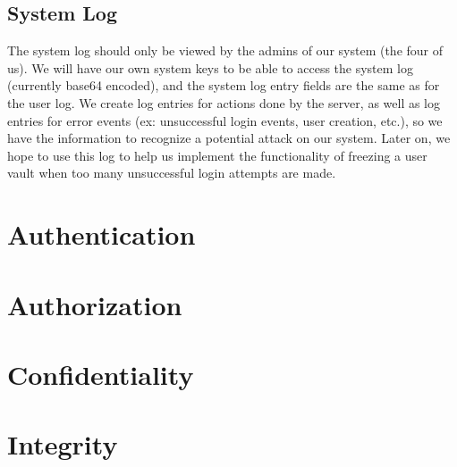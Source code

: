 \documentclass{article}
\begin{document}
\subsection{System Log}
The system log should only be viewed by the admins of our system (the four of us). We will have our own system keys to be able to access the system log (currently base64 encoded), and the system log entry fields are the same as for the user log. We create log entries for actions done by the server, as well as log entries for error events (ex: unsuccessful login events, user creation, etc.), so we have the information to recognize a potential attack on our system. Later on, we hope to use this log to help us implement the functionality of freezing a user vault when too many unsuccessful login attempts are made.

\section{Authentication}
\section{Authorization}
\section{Confidentiality}
\section{Integrity}
\end{document}
